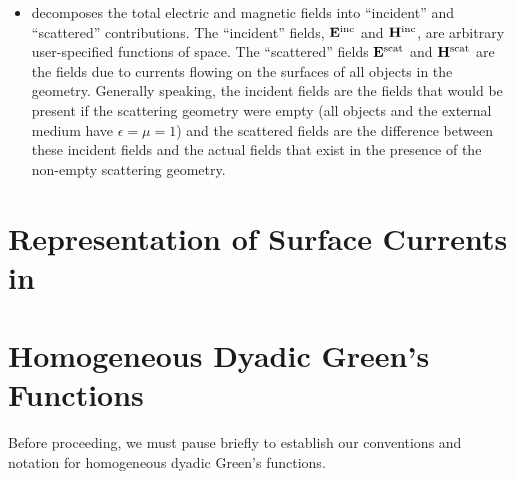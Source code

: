 \documentclass[letterpaper]{article}
\begin{document}
\begin{itemize}
\item
\lss decomposes the total electric and magnetic fields into 
``incident'' and ``scattered'' contributions. The ``incident'' 
fields, $\mathbf{E}^{\hbox{\scriptsize{inc}}}$ and $\mathbf{H}^{\hbox{\scriptsize{inc}}}$, 
are arbitrary user-specified functions of space.
The ``scattered'' fields $\mathbf{E}^{\hbox{\scriptsize{scat}}}$ and 
$\mathbf{H}^{\hbox{\scriptsize{scat}}}$ are the fields due to currents
flowing on the surfaces of all objects in the \lss geometry.
Generally speaking, the incident fields are the fields that
would be present if the scattering geometry were 
empty (all objects and the external medium have
$\epsilon=\mu=1$) and the scattered fields are the difference
between these incident fields and the actual fields that
exist in the presence of the non-empty scattering geometry. 

\end{itemize}

\newpage
\section{Representation of Surface Currents in \ls}

\newpage
\section{Homogeneous Dyadic Green's Functions}
\label{DyadicGreensFunctionsSection}

Before proceeding, we must pause briefly to establish our 
conventions and notation for homogeneous dyadic Green's
functions.
\end{document}
